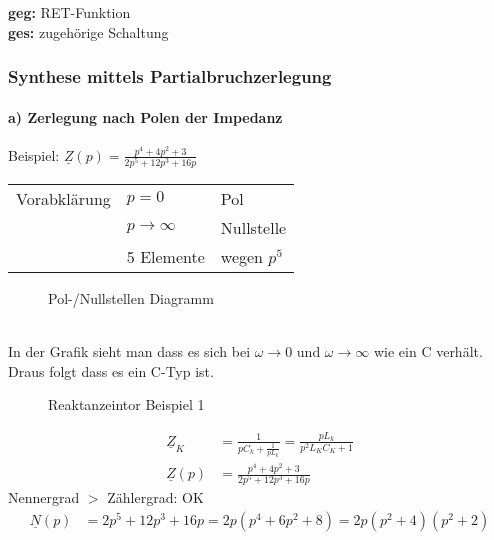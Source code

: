 \begin{figure}[H]
\begin{center}
  
\end{center}
\end{figure}

\textbf{geg:} RET-Funktion\\
\textbf{ges:} zugehörige Schaltung\\


\subsubsection{Synthese mittels Partialbruchzerlegung}
\paragraph{a) Zerlegung nach Polen der Impedanz}
Beispiel: $\underline{Z}(p) = \frac{p^4+4p^2+3}{2p^5+12p^3+16p}$\\
\begin{tabular}{lll}
	Vorabklärung & $p=0$ & Pol \\
	& $p \rightarrow \infty$ & Nullstelle \\
	& 5 Elemente & wegen $p^5$ \\
\end{tabular}
\begin{figure}[!h]
	\centering
	
	\caption{Pol-/Nullstellen Diagramm}
	\label{fig:RetPolNullstelle}
\end{figure}\\
In der Grafik sieht man dass es sich bei $\omega \rightarrow 0$ und $\omega
\rightarrow \infty$ wie ein C verhält. Draus folgt dass es ein C-Typ ist.\\
\begin{figure}[!h]
	\centering
	
	\caption{Reaktanzeintor Beispiel 1}
	\label{fig:RetSyntheseBsp1S}
\end{figure}
\begin{align}
\underline{Z}_K&=\frac{1}{pC_k+\frac{1}{pL_k}} =
\frac{pL_k}{p^2L_KC_K+1}\nonumber\\
\underline{Z}(p)&=\frac{p^4+4p^2+3}{2p^5+12p^3+16p}\nonumber
\end{align}
Nennergrad $>$ Zählergrad: OK\\
\begin{align}
\underline{N}(p)&=2p^5+12p^3+16p=2p\left(p^4+6p^2+8\right)=2p\left(p^2+4\right)\left(p^2+2\right)\nonumber
\end{align}

